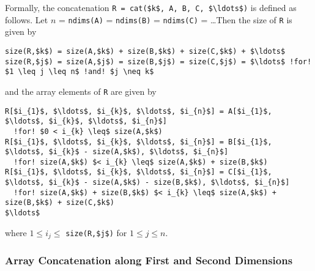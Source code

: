 Formally, the concatenation \lstinline!R = cat($k$, A, B, C, $\ldots$)! is defined as follows.  Let $n$ = \lstinline!ndims(A)! = \lstinline!ndims(B)! = \lstinline!ndims(C)! = \ldots  Then the size of \lstinline!R! is given by
\begin{lstlisting}[language=modelica,escapechar=!,frame=none,xleftmargin=1em]
size(R,$k$) = size(A,$k$) + size(B,$k$) + size(C,$k$) + $\ldots$
size(R,$j$) = size(A,$j$) = size(B,$j$) = size(C,$j$) = $\ldots$ !for! $1 \leq j \leq n$ !and! $j \neq k$
\end{lstlisting}
and the array elements of \lstinline!R! are given by
\begin{lstlisting}[language=modelica,escapechar=!,frame=none,xleftmargin=1em]
R[$i_{1}$, $\ldots$, $i_{k}$, $\ldots$, $i_{n}$] = A[$i_{1}$, $\ldots$, $i_{k}$, $\ldots$, $i_{n}$]
  !for! $0 < i_{k} \leq$ size(A,$k$)
R[$i_{1}$, $\ldots$, $i_{k}$, $\ldots$, $i_{n}$] = B[$i_{1}$, $\ldots$, $i_{k}$ - size(A,$k$), $\ldots$, $i_{n}$]
  !for! size(A,$k$) $< i_{k} \leq$ size(A,$k$) + size(B,$k$)
R[$i_{1}$, $\ldots$, $i_{k}$, $\ldots$, $i_{n}$] = C[$i_{1}$, $\ldots$, $i_{k}$ - size(A,$k$) - size(B,$k$), $\ldots$, $i_{n}$]
  !for! size(A,$k$) + size(B,$k$) $< i_{k} \leq$ size(A,$k$) + size(B,$k$) + size(C,$k$)
$\ldots$
\end{lstlisting}
where $1 \leq i_{j} \leq$ \lstinline!size(R,$j$)! for $1 \leq j \leq n$.


\subsubsection{Array Concatenation along First and Second Dimensions}\label{array-concatenation-along-first-and-second-dimensions}

